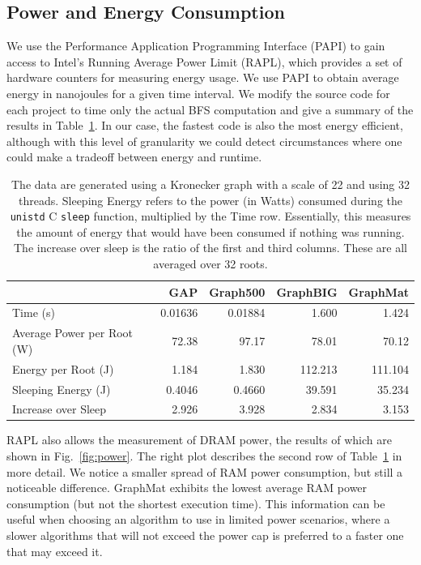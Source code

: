 \documentclass[conference]{IEEEtran}
\begin{document}
\subsection{Power and Energy Consumption}
We use the Performance Application Programming Interface (PAPI) \cite{Browne:2000:PAPI} to gain access to Intel's Running Average Power Limit (RAPL), which provides a set of hardware counters for measuring energy usage. We use PAPI to obtain average energy in nanojoules for a given time interval. We modify the source code for each project to time only the actual BFS computation and give a summary of the results in Table~\ref{tab:power}. In our case, the fastest code is also the most energy efficient, although with this level of granularity we could detect circumstances where one could make a tradeoff between energy and runtime.

\begin{table}
	\caption{The data are generated using a Kronecker graph with a scale of 22 and using 32 threads. Sleeping Energy refers to the power (in Watts) consumed during the \texttt{unistd} C \texttt{sleep} function, multiplied by the Time row. Essentially, this measures the amount of energy that would have been consumed if nothing was running. The increase over sleep is the ratio of the first and third columns. These are all averaged over 32 roots.}
	\centering
	\begin{tabular}{l|r|r|r|r}
			&	GAP  &    Graph500 & GraphBIG & GraphMat \\ \hline
		Time (s) &  0.01636 & 0.01884 & 1.600 & 1.424 \\
		Average Power per Root (W) & 72.38 & 97.17 & 78.01 & 70.12 \\
		Energy per Root (J) &	1.184 & 1.830 & 112.213 & 111.104 \\
		Sleeping Energy (J) & 0.4046  & 0.4660 & 39.591 &  35.234 \\
		Increase over Sleep & 2.926 & 3.928 & 2.834 & 3.153
	\end{tabular}
	\label{tab:power}
\end{table}

RAPL also allows the measurement of DRAM power, the results of which are shown in Fig.~\ref{fig:power}. The right plot describes the second row of Table~\ref{tab:power} in more detail. We notice a smaller spread of RAM power consumption, but still a noticeable difference. GraphMat exhibits the lowest average RAM power consumption (but not the shortest execution time). This information can be useful when choosing an algorithm to use in limited power scenarios, where a slower algorithms that will not exceed the power cap is preferred to a faster one that may exceed it.
\end{document}
